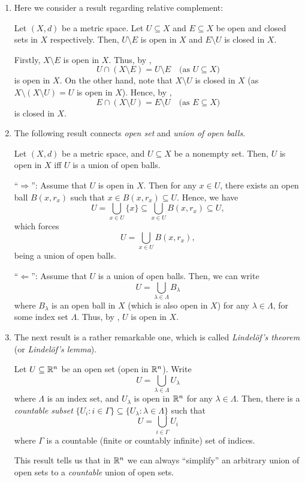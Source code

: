 \begin{enumerate}
\item Here we consider a result regarding relative complement:
\begin{proposition}
\label{prp:open-closed-comple}
Let \((X,d)\) be a metric space.  Let \(U\subseteq X\) and \(E\subseteq X\) be
open and closed sets in \(X\) respectively. Then, \(U\setminus E\) is open in
\(X\) and \(E\setminus U\) is closed in \(X\).
\end{proposition}
\begin{pf}
Firstly, \(X\setminus E\) is open in \(X\). Thus, by
,
\[
U\cap (X\setminus E)=U\setminus E\quad\text{(as \(U\subseteq X\))}
\]
is open in \(X\). On the other hand, note that \(X\setminus U\) is closed in
\(X\) (as \(X\setminus (X\setminus U)=U\) is open in \(X\)). Hence, by
,
\[
E\cap (X\setminus U)=E\setminus U\quad\text{(as \(E\subseteq X\))}
\]
is closed in \(X\).
\end{pf}
\item The following result connects \emph{open set} and \emph{union of open
balls}.
\begin{proposition}
\label{prp:open-set-union-open-balls}
Let \((X,d)\) be a metric space, and \(U\subseteq X\) be a nonempty set. Then,
\(U\) is open in \(X\) iff \(U\) is a union of open balls.
\end{proposition}
\begin{pf}
``\(\Rightarrow\)'': Assume that \(U\) is open in \(X\). Then for any \(x\in
U\), there exists an open ball \(B(x,r_x)\) such that \(x\in B(x,r_x)\subseteq
U\). Hence, we have
\[
U=\bigcup_{x\in U}\{x\}\subseteq \bigcup_{x\in U}B(x,r_x)\subseteq U,
\]
which forces 
\[
U=\bigcup_{x\in U}B(x,r_x),
\]
being a union of open balls.

``\(\Leftarrow\)'': Assume that \(U\) is a union of open balls. Then, we can
write
\[
U=\bigcup_{\lambda\in \Lambda}B_{\lambda}
\]
where \(B_{\lambda}\) is an open ball in \(X\) (which is also open in \(X\))
for any \(\lambda\in\Lambda\), for some index set \(\Lambda\). Thus, by
, \(U\) is open in \(X\).
\end{pf}

\item The next result is a rather remarkable one, which is called
\emph{Lindel\"{o}f's theorem} (or \emph{Lindel\"{o}f's lemma}).
\begin{theorem}
\label{thm:lindelof}
Let \(U\subseteq \mathbb{R}^n\) be an open set (open in \(\mathbb{R}^n\)). Write
\[
U=\bigcup_{\lambda\in\Lambda}U_{\lambda}
\]
where \(\Lambda\) is an index set, and \(U_\lambda\) is open in \(\mathbb{R}^n\) for
any \(\lambda\in\Lambda\).  Then, there is a \emph{countable subset}
\(\{U_i:i\in\Gamma\}\subseteq \{U_{\lambda}:\lambda\in\Lambda\}\) such that
\[
U=\bigcup_{i\in\Gamma}U_{i}
\]
where \(\Gamma\) is a countable (finite or countably infinite) set of
indices.
\end{theorem}
\begin{intuition}
This result tells us that in \(\mathbb{R}^n\) we can always ``simplify'' an arbitrary
union of open sets to a \emph{countable} union of open sets.
\end{intuition}


\end{enumerate}
